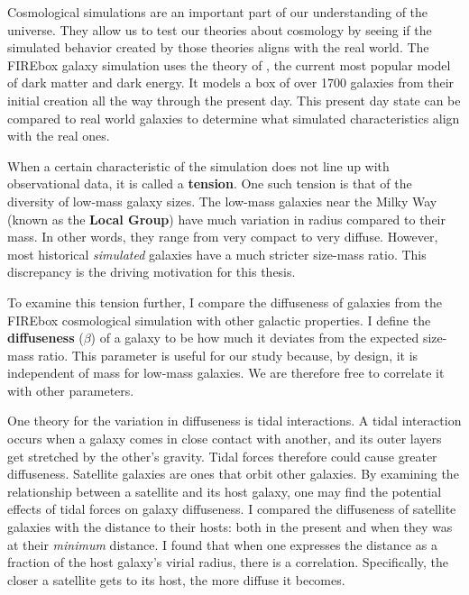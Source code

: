 
Cosmological simulations are an important part of our understanding of the universe. They allow us to test our theories about cosmology by seeing if the simulated behavior created by those theories aligns with the real world. The FIREbox galaxy simulation uses the theory of \textbf{\lcdm}, the current most popular model of dark matter and dark energy. It models a box of over 1700 galaxies from their initial creation all the way through the present day. This present day state can be compared to real world galaxies to determine what simulated characteristics align with the real ones.

When a certain characteristic of the simulation does not line up with observational data, it is called a \textbf{tension}. One such tension is that of the diversity of low-mass galaxy sizes. The low-mass galaxies near the Milky Way (known as the \textbf{Local Group}) have much variation in radius compared to their mass. In other words, they range from very compact to very diffuse. However, most historical \emph{simulated} galaxies have a much stricter size-mass ratio. This discrepancy is the driving motivation for this thesis.

To examine this tension further, I compare the diffuseness of galaxies from the FIREbox cosmological simulation with other galactic properties. I define the \textbf{diffuseness} ($\beta$) of a galaxy to be how much it deviates from the expected size-mass ratio. This parameter is useful for our study because, by design, it is independent of mass for low-mass galaxies. We are therefore free to correlate it with other parameters.

One theory for the variation in diffuseness is tidal interactions. A tidal interaction occurs when a galaxy comes in close contact with another, and its outer layers get stretched by the other's gravity. Tidal forces therefore could cause greater diffuseness. Satellite galaxies are ones that orbit other galaxies. By examining the relationship between a satellite and its host galaxy, one may find the potential effects of tidal forces on galaxy diffuseness. I compared the diffuseness of satellite galaxies with the distance to their hosts: both in the present and when they was at their \emph{minimum} distance. I found that when one expresses the distance as a fraction of the host galaxy's virial radius, there is a correlation. Specifically, the closer a satellite gets to its host, the more diffuse it becomes.